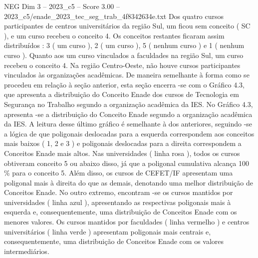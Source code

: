 \begin{textsample}{NEG Dim 3 – 2023\_c5 – Score 3.00 – 2023\_c5/enade\_2023\_tec\_seg\_trab\_4f8342634e.txt}
Dos quatro cursos participantes de centros universitários da região Sul, um ficou sem conceito ( SC ), e um curso recebeu o conceito 4.
Os conceitos restantes ficaram assim distribuídos : 3 ( um curso ), 2 ( um curso ), 5 ( nenhum curso ) e 1 ( nenhum curso ).
Quanto aos um curso vinculados a faculdades na região Sul, um curso recebeu o conceito 4.
Na região Centro-Oeste, não houve cursos participantes vinculados às organizações acadêmicas.
De maneira semelhante à forma como se procedeu em relação à seção anterior, esta seção encerra -se com o Gráfico 4.3, que apresenta a distribuição do Conceito Enade dos cursos de Tecnologia em Segurança no Trabalho segundo a organização acadêmica da IES.
No Gráfico 4.3, apresenta -se a distribuição do Conceito Enade segundo a organização acadêmica da IES.
A leitura desse último gráfico é semelhante à dos anteriores, seguindo -se a lógica de que poligonais deslocadas para a esquerda correspondem aos conceitos mais baixos ( 1, 2 e 3 ) e poligonais deslocadas para a direita correspondem a Conceitos Enade mais altos.
Nas universidades ( linha rosa ), todos os cursos obtiveram conceito 5 ou abaixo disso, já que a poligonal cumulativa alcança 100 \% para o conceito 5.
Além disso, os cursos de CEFET/IF apresentam uma poligonal mais à direita do que as demais, denotando uma melhor distribuição de Conceitos Enade.
No outro extremo, encontram -se os cursos mantidos por universidades ( linha azul ), apresentando as respectivas poligonais mais à esquerda e, consequentemente, uma distribuição de Conceitos Enade com os menores valores.
Os cursos mantidos por faculdades ( linha vermelho ) e centros universitários ( linha verde ) apresentam poligonais mais centrais e, consequentemente, uma distribuição de Conceitos Enade com os valores intermediários.

\end{textsample}
